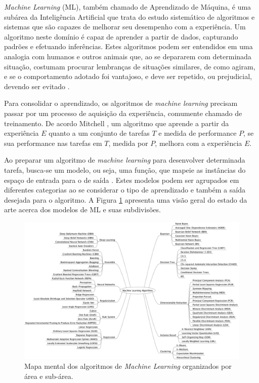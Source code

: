 
\emph{Machine Learning} (ML), também chamado de Aprendizado de Máquina, é uma subárea da Inteligência Artificial que trata do estudo sistemático de algoritmos e sistemas que são capazes de melhorar seu desempenho com a experiência. Um algoritmo neste domínio é capaz de aprender a partir de dados, capturando padrões e efetuando inferências. Estes algoritmos podem ser entendidos em uma analogia com  humanos e outros animais que, ao se depararem com determinada situação, costumam procurar lembranças de situações similares, de como agiram, e se o comportamento adotado foi vantajoso, e deve ser repetido, ou prejudicial, devendo ser evitado \cite{marsland2015machine,goodfellow2016deep,flach2012machine}.

Para consolidar o aprendizado, os algoritmos de \emph{machine learning} precisam passar por um processo de aquisição da experiência, comumente chamado de treinamento. De acordo Mitchell \cite{mitchell1997machine}, um algoritmo que aprende a partir da experiência $E$ quanto a um conjunto de tarefas $T$ e medida de performance $P$, se sua performance nas tarefas em $T$, medida por $P$, melhora com a experiência $E$.

Ao preparar um algoritmo de \emph{machine learning} para desenvolver determinada tarefa, busca-se um modelo, ou seja, uma função, que mapeie as instâncias do espaço de entrada para o de saída \cite{flach2012machine}. Estes modelos podem ser agrupados em diferentes categorias ao se considerar o tipo de aprendizado e também a saída desejada para o algoritmo. A Figura \ref{fig:ml_algorithms} apresenta uma visão geral do estado da arte acerca dos modelos de ML e suas subdivisões.

\begin{figure}
	\includegraphics[width=\linewidth]{img/machinelearningalgorithms.png}
	\caption{Mapa mental dos algoritmos de \emph{Machine Learning} organizados por área e sub-área.}
	\label{fig:ml_algorithms}
\end{figure}

